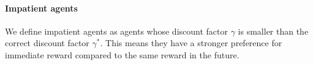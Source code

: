 \paragraph{Impatient agents}
We define impatient agents as agents whose discount factor $\gamma$ is smaller than the correct discount factor $\gamma^*$. This means they have a stronger preference for immediate reward compared to the same reward in the future.
